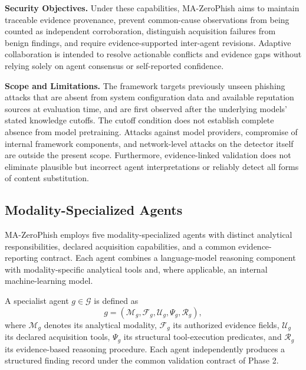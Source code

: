 \noindent\textbf{Security Objectives.}
Under these capabilities, MA-ZeroPhish
aims to maintain traceable evidence
provenance, prevent common-cause
observations from being counted as
independent corroboration, distinguish
acquisition failures from benign findings,
and require evidence-supported inter-agent
revisions. Adaptive collaboration is
intended to resolve actionable conflicts
and evidence gaps without relying solely
on agent consensus or self-reported
confidence.

\noindent\textbf{Scope and Limitations.}
The framework targets previously unseen
phishing attacks that are absent from
system configuration data and available
reputation sources at evaluation time,
and are first observed after the underlying
models' stated knowledge cutoffs.
The cutoff condition does not establish
complete absence from model pretraining.
Attacks against model providers, compromise
of internal framework components, and
network-level attacks on the detector
itself are outside the present scope.
Furthermore, evidence-linked validation
does not eliminate plausible but incorrect
agent interpretations or reliably detect
all forms of content substitution.



\subsection{Modality-Specialized Agents}
\label{sec:specialists}

MA-ZeroPhish employs five modality-specialized
agents with distinct analytical responsibilities,
declared acquisition capabilities, and a common
evidence-reporting contract. Each agent combines
a language-model reasoning component with
modality-specific analytical tools and, where
applicable, an internal machine-learning model.

\begin{definition}
A specialist agent $g\in\mathcal G$ is defined as
\begin{equation}
g=(\mathcal M_g,\mathcal F_g,\mathcal U_g,
\Psi_g,\mathcal R_g),
\label{eq:agent-definition}
\end{equation}
where $\mathcal M_g$ denotes its analytical
modality, $\mathcal F_g$ its authorized
evidence fields, $\mathcal U_g$ its declared
acquisition tools, $\Psi_g$ its structural
tool-execution predicates, and $\mathcal R_g$
its evidence-based reasoning procedure.
Each agent independently produces a
structured finding record under the common
validation contract of Phase 2.
\end{definition}

